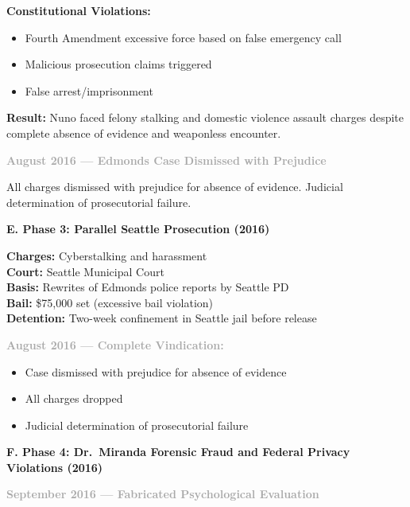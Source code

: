 \documentclass[11pt, letterpaper]{article}
\newcommand{\subsectiontitle}[1]{\vspace{0.15in}\noindent\textcolor{NavyBlue}{\textbf{#1}}\vspace{0.05in}}
\newcommand{\subsubsectiontitle}[1]{\vspace{0.1in}\noindent\textcolor{DarkGray}{\textbf{#1}}\vspace{0.05in}}
\begin{document}
\textbf{Constitutional Violations:}
\begin{itemize}[leftmargin=*,itemsep=2pt]
    \item Fourth Amendment excessive force based on false emergency call
    \item Malicious prosecution claims triggered
    \item False arrest/imprisonment
\end{itemize}

\textbf{Result:} Nuno faced felony stalking and domestic violence assault charges despite complete absence of evidence and weaponless encounter.

\subsubsectiontitle{August 2016 --- Edmonds Case Dismissed with Prejudice}

All charges dismissed with prejudice for absence of evidence. Judicial determination of prosecutorial failure.

\subsectiontitle{E. Phase 3: Parallel Seattle Prosecution (2016)}

\noindent
\textbf{Charges:} Cyberstalking and harassment\\
\textbf{Court:} Seattle Municipal Court\\
\textbf{Basis:} Rewrites of Edmonds police reports by Seattle PD\\
\textbf{Bail:} \$75,000 set (excessive bail violation)\\
\textbf{Detention:} Two-week confinement in Seattle jail before release

\subsubsectiontitle{August 2016 --- Complete Vindication:}
\begin{itemize}[leftmargin=*,itemsep=2pt]
    \item Case dismissed with prejudice for absence of evidence
    \item All charges dropped
    \item Judicial determination of prosecutorial failure
\end{itemize}

\subsectiontitle{F. Phase 4: Dr.\ Miranda Forensic Fraud and Federal Privacy Violations (2016)}

\subsubsectiontitle{September 2016 --- Fabricated Psychological Evaluation}
\end{document}
